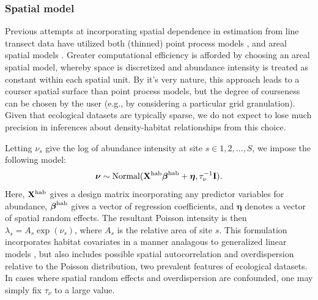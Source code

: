 \documentclass[10pt]{article}
\begin{document}
\subsubsection*{Spatial model}

Previous attempts at incorporating spatial dependence in estimation from line transect data have utilized both (thinned) point process models \cite{HedleyBuckland2004,JohnsonEtAl2010}, and areal spatial models \cite{SchmidtEtAl2012}.  Greater computational efficiency is afforded by choosing an areal spatial model, whereby space is discretized and abundance intensity is treated as constant within each spatial unit.  By it's very nature, this approach leads to a courser spatial surface than point process models, but the degree of courseness can be chosen by the user (e.g., by considering a particular grid granulation).  Given that ecological datasets are typically sparse, we do not expect to lose much precision in inferences about density-habitat relationships from this choice.

Letting $\nu_s$ give the log of abundance intensity at site $s \in {1,2,\hdots,S}$, we impose the following model:
$$
 \boldsymbol{\nu} \sim {\rm Normal}({\bf X}^{\rm hab}
 \boldsymbol{\beta}^{\rm hab}+\boldsymbol{\eta},\tau_\nu^{-1}{\bf I}).
$$
Here, ${\bf X}^{\rm hab}$ gives a design matrix incorporating any predictor variables for abundance, $\boldsymbol{\beta}^{\rm hab}$ gives a vector of regression coefficients, and  $\boldsymbol{\eta}$ denotes a vector of spatial random effects.
The resultant Poisson intensity is then $\lambda_s=A_s \exp(\nu_s)$, where $A_s$ is the relative area of site $s$.  This formulation incorporates habitat covariates in a manner analagous to generalized linear models \cite{McCullaghNelder1989}, but also includes possible spatial autocorrelation and overdispersion relative to the Poisson distribution, two prevalent features of ecological datasets.  In cases where spatial random effects and overdispersion are confounded, one may simply fix $\tau_\nu$ to a large value.
\end{document}
